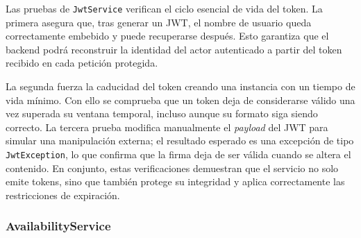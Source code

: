 \documentclass[12pt,a4paper,twoside]{report}
\begin{document}
Las pruebas de \texttt{JwtService} verifican el ciclo esencial de vida del token. La primera asegura que, tras generar un JWT, el nombre de usuario queda correctamente embebido y puede recuperarse después. Esto garantiza que el backend podrá reconstruir la identidad del actor autenticado a partir del token recibido en cada petición protegida.

La segunda fuerza la caducidad del token creando una instancia con un tiempo de vida mínimo. Con ello se comprueba que un token deja de considerarse válido una vez superada su ventana temporal, incluso aunque su formato siga siendo correcto. La tercera prueba modifica manualmente el \emph{payload} del JWT para simular una manipulación externa; el resultado esperado es una excepción de tipo \texttt{JwtException}, lo que confirma que la firma deja de ser válida cuando se altera el contenido. En conjunto, estas verificaciones demuestran que el servicio no solo emite tokens, sino que también protege su integridad y aplica correctamente las restricciones de expiración.

\subsubsection{AvailabilityService}
\end{document}
